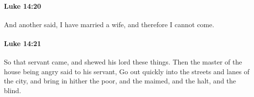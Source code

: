 		\paragraph{Luke 14:20} %
			\label{LUKE-14-20}

			And another said, I have married a wife, and therefore I cannot come.

			\begin{framed}
			\scriptsize
				\begin{compactdesc}
					\item[SBLG] 
				\end{compactdesc}
			\end{framed}

		\paragraph{Luke 14:21} %
			\label{LUKE-14-21}

			So that servant came, and shewed his lord these things. Then the master of the house being angry said to his servant, Go out quickly into the streets and lanes of the city, and bring in hither the poor, and the maimed, and the halt, and the blind.

